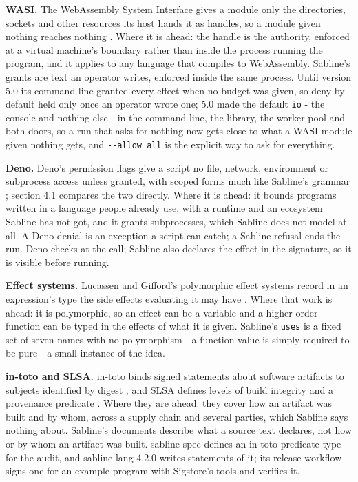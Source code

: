 \documentclass[
]{article}
\begin{document}
\textbf{WASI.} The WebAssembly System Interface gives a module only the
directories, sockets and other resources its host hands it as handles,
so a module given nothing reaches nothing \citep{wasi}. Where it is
ahead: the handle is the authority, enforced at a virtual machine's
boundary rather than inside the process running the program, and it
applies to any language that compiles to WebAssembly. Sabline's grants
are text an operator writes, enforced inside the same process. Until
version 5.0 its command line granted every effect when no budget was
given, so deny-by-default held only once an operator wrote one; 5.0 made
the default \texttt{io} - the console and nothing else - in the command
line, the library, the worker pool and both doors, so a run that asks
for nothing now gets close to what a WASI module given nothing gets, and
\texttt{-\/-allow\ all} is the explicit way to ask for everything.

\textbf{Deno.} Deno's permission flags give a script no file, network,
environment or subprocess access unless granted, with scoped forms much
like Sabline's grammar \citep{deno_security}; section 4.1 compares the
two directly. Where it is ahead: it bounds programs written in a
language people already use, with a runtime and an ecosystem Sabline has
not got, and it grants subprocesses, which Sabline does not model at
all. A Deno denial is an exception a script can catch; a Sabline refusal
ends the run. Deno checks at the call; Sabline also declares the effect
in the signature, so it is visible before running.

\textbf{Effect systems.} Lucassen and Gifford's polymorphic effect
systems record in an expression's type the side effects evaluating it
may have \citep{lucassen1988effects}. Where that work is ahead: it is
polymorphic, so an effect can be a variable and a higher-order function
can be typed in the effects of what it is given. Sabline's \texttt{uses}
is a fixed set of seven names with no polymorphism - a function value is
simply required to be pure - a small instance of the idea.

\textbf{in-toto and SLSA.} in-toto binds signed statements about
software artifacts to subjects identified by digest
\citep{torresarias2019intoto, intoto_attestation}, and SLSA defines
levels of build integrity and a provenance predicate \citep{slsa}. Where
they are ahead: they cover how an artifact was built and by whom, across
a supply chain and several parties, which Sabline says nothing about.
Sabline's documents describe what a source text declares, not how or by
whom an artifact was built. sabline-spec defines an in-toto predicate
type for the audit, and sabline-lang 4.2.0 writes statements of it; its
release workflow signs one for an example program with Sigstore's tools
and verifies it.
\end{document}
